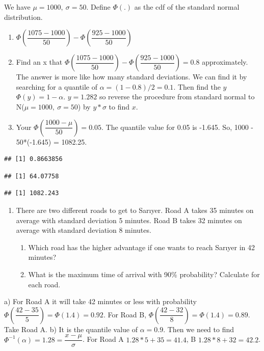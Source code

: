 \documentclass[]{book}
\providecommand{\tightlist}{%
  \setlength{\itemsep}{0pt}\setlength{\parskip}{0pt}}
\theoremstyle{definition}
\theoremstyle{definition}
\theoremstyle{definition}
\theoremstyle{remark}
\begin{document}
We have \(\mu = 1000,\ \sigma = 50\). Define \(\Phi(.)\) as the cdf of
the standard normal distribution.

\begin{enumerate}
\def\labelenumi{\alph{enumi})}
\tightlist
\item
  \(\Phi(\dfrac{1075-1000}{50})-\Phi(\dfrac{925-1000}{50})\)
\item
  Find an x that
  \(\Phi(\dfrac{1075-1000}{50})-\Phi(\dfrac{925-1000}{50}) = 0.8\)
  approximately. The answer is more like how many standard deviations.
  We can find it by searching for a quantile of
  \(\alpha=(1-0.8)/2 = 0.1\). Then find the \(y\) \(\Phi(y)=1-\alpha\).
  \(y = 1.282\) so reverse the procedure from standard normal to
  N(\(\mu = 1000,\ \sigma = 50\)) by \(y * \sigma\) to find \(x\).
\item
  Your \(\Phi(\dfrac{1000 - \mu}{50}) = 0.05\). The quantile value for
  0.05 is -1.645. So, 1000 - 50*(-1.645) = 1082.25.
\end{enumerate}

\begin{verbatim}
## [1] 0.8663856
\end{verbatim}

\begin{verbatim}
## [1] 64.07758
\end{verbatim}

\begin{verbatim}
## [1] 1082.243
\end{verbatim}

\begin{enumerate}
\def\labelenumi{\arabic{enumi}.}
\setcounter{enumi}{4}
\item
  There are two different roads to get to Sarıyer. Road A takes 35
  minutes on average with standard deviation 5 minutes. Road B takes 32
  minutes on average with standard deviation 8 minutes.

  \begin{enumerate}
  \def\labelenumii{\alph{enumii})}
  \tightlist
  \item
    Which road has the higher advantage if one wants to reach Sarıyer in
    42 minutes?
  \item
    What is the maximum time of arrival with 90\% probability? Calculate
    for each road.
  \end{enumerate}
\end{enumerate}

a) For Road A it will take 42 minutes or less with probability
\(\Phi(\dfrac{42-35}{5}) = \Phi(1.4) = 0.92\). For Road B,
\(\Phi(\dfrac{42-32}{8}) = \Phi(1.4) = 0.89\). Take Road A. b) It is the
quantile value of \(\alpha = 0.9\). Then we need to find
\(\Phi^{-1}(\alpha) = 1.28 = \dfrac{x-\mu}{\sigma}\). For Road A
\(1.28*5 + 35 = 41.4\), B \(1.28*8 + 32 = 42.2\).
\end{document}
